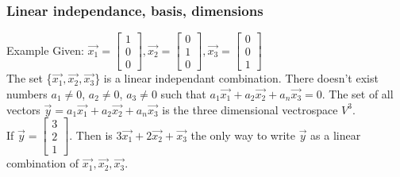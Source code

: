 \begin{frame}
	\frametitle{Linear independance, basis, dimensions}
	\begin{block}{Example}
		Given: $\overrightarrow{x_1}=\begin{bmatrix} 1\\0\\0\end{bmatrix}, \overrightarrow{x_2}=\begin{bmatrix} 0\\1\\0\end{bmatrix}, \overrightarrow{x_3}=\begin{bmatrix} 0\\0\\1\end{bmatrix}$\\
		The set \big\{$\overrightarrow{x_1},\overrightarrow{x_2},\overrightarrow{x_3}$\big\} is a linear independant combination. There doesn't exist numbers $a_1\neq0$, $a_2\neq0$, $a_3\neq0$ such that $a_1\overrightarrow{x_1}+a_2\overrightarrow{x_2}+a_n\overrightarrow{x_3}=0$. The set of all vectors $\overrightarrow{y}= a_1\overrightarrow{x_1}+ a_2\overrightarrow{x_2}+ a_n\overrightarrow{x_3}$ is the three dimensional vectrospace $V^3$.\\
		If $\overrightarrow{y}=\begin{bmatrix} 3\\2\\1\end{bmatrix}$. Then is $3\overrightarrow{x_1}+2\overrightarrow{x_2}+\overrightarrow{x_3}$ the only way to write $\overrightarrow{y}$ as a linear combination of $\overrightarrow{x_1},\overrightarrow{x_2},\overrightarrow{x_3}$.
	\end{block}
\end{frame}

